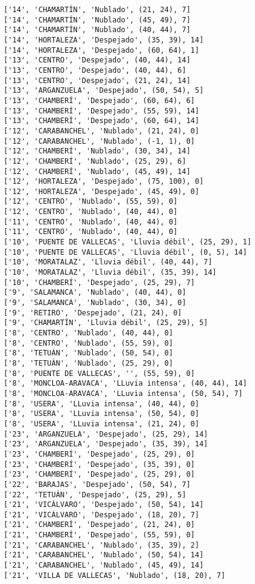 \documentclass[11pt]{article}
\begin{document}
\begin{Verbatim}[commandchars=\\\{\}]
['14', 'CHAMARTÍN', 'Nublado', (21, 24), 7]
['14', 'CHAMARTÍN', 'Nublado', (45, 49), 7]
['14', 'CHAMARTÍN', 'Nublado', (40, 44), 7]
['14', 'HORTALEZA', 'Despejado', (35, 39), 14]
['14', 'HORTALEZA', 'Despejado', (60, 64), 1]
['13', 'CENTRO', 'Despejado', (40, 44), 14]
['13', 'CENTRO', 'Despejado', (40, 44), 6]
['13', 'CENTRO', 'Despejado', (21, 24), 14]
['13', 'ARGANZUELA', 'Despejado', (50, 54), 5]
['13', 'CHAMBERÍ', 'Despejado', (60, 64), 6]
['13', 'CHAMBERÍ', 'Despejado', (55, 59), 14]
['13', 'CHAMBERÍ', 'Despejado', (60, 64), 14]
['12', 'CARABANCHEL', 'Nublado', (21, 24), 0]
['12', 'CARABANCHEL', 'Nublado', (-1, 1), 0]
['12', 'CHAMBERÍ', 'Nublado', (30, 34), 14]
['12', 'CHAMBERÍ', 'Nublado', (25, 29), 6]
['12', 'CHAMBERÍ', 'Nublado', (45, 49), 14]
['12', 'HORTALEZA', 'Despejado', (75, 100), 0]
['12', 'HORTALEZA', 'Despejado', (45, 49), 0]
['12', 'CENTRO', 'Nublado', (55, 59), 0]
['12', 'CENTRO', 'Nublado', (40, 44), 0]
['11', 'CENTRO', 'Nublado', (40, 44), 0]
['11', 'CENTRO', 'Nublado', (40, 44), 0]
['10', 'PUENTE DE VALLECAS', 'Lluvia débil', (25, 29), 1]
['10', 'PUENTE DE VALLECAS', 'Lluvia débil', (0, 5), 14]
['10', 'MORATALAZ', 'Lluvia débil', (40, 44), 7]
['10', 'MORATALAZ', 'Lluvia débil', (35, 39), 14]
['10', 'CHAMBERÍ', 'Despejado', (25, 29), 7]
['9', 'SALAMANCA', 'Nublado', (40, 44), 0]
['9', 'SALAMANCA', 'Nublado', (30, 34), 0]
['9', 'RETIRO', 'Despejado', (21, 24), 0]
['9', 'CHAMARTÍN', 'Lluvia débil', (25, 29), 5]
['8', 'CENTRO', 'Nublado', (40, 44), 0]
['8', 'CENTRO', 'Nublado', (55, 59), 0]
['8', 'TETUÁN', 'Nublado', (50, 54), 0]
['8', 'TETUÁN', 'Nublado', (25, 29), 0]
['8', 'PUENTE DE VALLECAS', '', (55, 59), 0]
['8', 'MONCLOA-ARAVACA', 'LLuvia intensa', (40, 44), 14]
['8', 'MONCLOA-ARAVACA', 'LLuvia intensa', (50, 54), 7]
['8', 'USERA', 'LLuvia intensa', (40, 44), 0]
['8', 'USERA', 'LLuvia intensa', (50, 54), 0]
['8', 'USERA', 'LLuvia intensa', (21, 24), 0]
['23', 'ARGANZUELA', 'Despejado', (25, 29), 14]
['23', 'ARGANZUELA', 'Despejado', (35, 39), 14]
['23', 'CHAMBERÍ', 'Despejado', (25, 29), 0]
['23', 'CHAMBERÍ', 'Despejado', (35, 39), 0]
['23', 'CHAMBERÍ', 'Despejado', (25, 29), 0]
['22', 'BARAJAS', 'Despejado', (50, 54), 7]
['22', 'TETUÁN', 'Despejado', (25, 29), 5]
['21', 'VICÁLVARO', 'Despejado', (50, 54), 14]
['21', 'VICÁLVARO', 'Despejado', (18, 20), 7]
['21', 'CHAMBERÍ', 'Despejado', (21, 24), 0]
['21', 'CHAMBERÍ', 'Despejado', (55, 59), 0]
['21', 'CARABANCHEL', 'Nublado', (35, 39), 2]
['21', 'CARABANCHEL', 'Nublado', (50, 54), 14]
['21', 'CARABANCHEL', 'Nublado', (45, 49), 14]
['21', 'VILLA DE VALLECAS', 'Nublado', (18, 20), 7]

\end{Verbatim}
\end{document}

